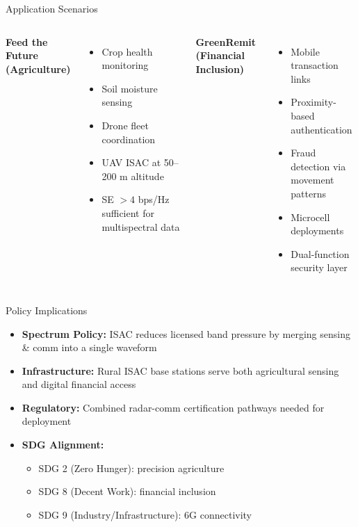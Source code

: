 \documentclass[11pt,aspectratio=169]{beamer}
\begin{document}
\begin{frame}{Application Scenarios}
\begin{columns}
\textbf{Feed the Future (Agriculture)}
\begin{itemize}
    \item Crop health monitoring
    \item Soil moisture sensing
    \item Drone fleet coordination
    \item UAV ISAC at 50--200 m altitude
    \item SE $>4$ bps/Hz sufficient for multispectral data
\end{itemize}
\textbf{GreenRemit (Financial Inclusion)}
\begin{itemize}
    \item Mobile transaction links
    \item Proximity-based authentication
    \item Fraud detection via movement patterns
    \item Microcell deployments
    \item Dual-function security layer
\end{itemize}
\end{columns}
\end{frame}

\begin{frame}{Policy Implications}
\begin{itemize}
    \item \textbf{Spectrum Policy:} ISAC reduces licensed band pressure by merging sensing \& comm into a single waveform
    \item \textbf{Infrastructure:} Rural ISAC base stations serve both agricultural sensing and digital financial access
    \item \textbf{Regulatory:} Combined radar-comm certification pathways needed for deployment
    \item \textbf{SDG Alignment:}
    \begin{itemize}
        \item SDG 2 (Zero Hunger): precision agriculture
        \item SDG 8 (Decent Work): financial inclusion
        \item SDG 9 (Industry/Infrastructure): 6G connectivity
    \end{itemize}
\end{itemize}
\end{frame}
\end{document}
